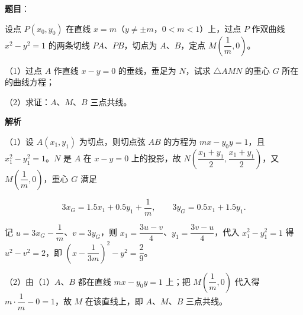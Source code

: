 \begin{answer}

\textbf{题目}：

设点 $P(x_0,y_0)$ 在直线 $x=m$（$y\neq\pm m$，$0<m<1$）上，过点 $P$ 作双曲线 $x^2-y^2=1$ 的两条切线 $PA$、$PB$，切点为 $A$、$B$，定点 $M\left(\dfrac1m,0\right)$。

（1）过点 $A$ 作直线 $x-y=0$ 的垂线，垂足为 $N$，试求 $\triangle AMN$ 的重心 $G$ 所在的曲线方程；

（2）求证：$A$、$M$、$B$ 三点共线。
\nopagebreak[4]
\begin{center}\end{center}
\nopagebreak[4]
\textbf{解析}

（1）设 $A(x_1,y_1)$ 为切点，则切点弦 $AB$ 的方程为 $mx-y_0y=1$，且 $x_1^2-y_1^2=1$。$N$ 是 $A$ 在 $x-y=0$ 上的投影，故 $N\left(\dfrac{x_1+y_1}2,\dfrac{x_1+y_1}2\right)$，又 $M\left(\dfrac1m,0\right)$，重心 $G$ 满足

\nopagebreak[4]
\[3x_G=1.5x_1+0.5y_1+\frac1m,\qquad 3y_G=0.5x_1+1.5y_1.\]

记 $u=3x_G-\dfrac1m$、$v=3y_G$，则 $x_1=\dfrac{3u-v}4$、$y_1=\dfrac{3v-u}4$，代入 $x_1^2-y_1^2=1$ 得 $u^2-v^2=2$，即 $\left(x-\dfrac1{3m}\right)^2-y^2=\dfrac29$。

（2）由（1）$A$、$B$ 都在直线 $mx-y_0y=1$ 上；把 $M\left(\dfrac1m,0\right)$ 代入得 $m\cdot\dfrac1m-0=1$，故 $M$ 在该直线上，即 $A$、$M$、$B$ 三点共线。


\end{answer}
